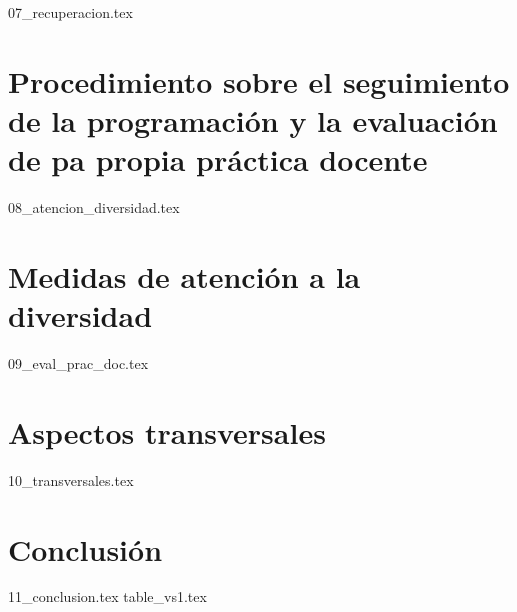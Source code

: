 \documentclass[a4paper,oneside,titlepage,12pt]{article}
\begin{document}
{07_recuperacion.tex}

\section{Procedimiento sobre el seguimiento de la programación y la evaluación de pa propia práctica docente}

{08_atencion_diversidad.tex}

\section{Medidas de atención a la diversidad}

{09_eval_prac_doc.tex}

\section{Aspectos transversales}

{10_transversales.tex}

\section{Conclusión}

{11_conclusion.tex}
{table_vs1.tex}
        
\end{document}
